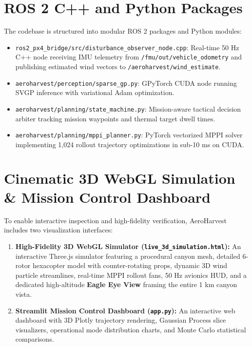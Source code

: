 \documentclass[12pt,a4paper,oneside]{report}
\begin{document}
\section{ROS 2 C++ and Python Packages}
The codebase is structured into modular ROS 2 packages and Python modules:
\begin{itemize}
    \item \texttt{ros2\_px4\_bridge/src/disturbance\_observer\_node.cpp}: Real-time 50 Hz C++ node receiving IMU telemetry from \texttt{/fmu/out/vehicle\_odometry} and publishing estimated wind vectors to \texttt{/aeroharvest/wind\_estimate}.
    \item \texttt{aeroharvest/perception/sparse\_gp.py}: GPyTorch CUDA node running SVGP inference with variational Adam optimization.
    \item \texttt{aeroharvest/planning/state\_machine.py}: Mission-aware tactical decision arbiter tracking mission waypoints and thermal target dwell times.
    \item \texttt{aeroharvest/planning/mppi\_planner.py}: PyTorch vectorized MPPI solver implementing 1,024 rollout trajectory optimizations in sub-10 ms on CUDA.
\end{itemize}

\section{Cinematic 3D WebGL Simulation \& Mission Control Dashboard}
To enable interactive inspection and high-fidelity verification, AeroHarvest includes two visualization interfaces:
\begin{enumerate}
    \item \textbf{High-Fidelity 3D WebGL Simulator (\texttt{live\_3d\_simulation.html}):} An interactive Three.js simulator featuring a procedural canyon mesh, detailed 6-rotor hexacopter model with counter-rotating props, dynamic 3D wind particle streamlines, real-time MPPI rollout fans, 50 Hz avionics HUD, and a dedicated high-altitude \textbf{Eagle Eye View} framing the entire 1 km canyon vista.
    \item \textbf{Streamlit Mission Control Dashboard (\texttt{app.py}):} An interactive web dashboard with 3D Plotly trajectory rendering, Gaussian Process slice visualizers, operational mode distribution charts, and Monte Carlo statistical comparisons.
\end{enumerate}

\end{document}
